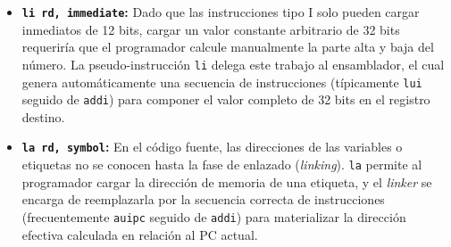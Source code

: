 \begin{itemize}
    \item \textbf{\texttt{li rd, immediate}:} Dado que las instrucciones tipo I solo pueden cargar inmediatos de 12 bits, cargar un valor constante arbitrario de 32 bits requeriría que el programador calcule manualmente la parte alta y baja del número. La pseudo-instrucción \texttt{li} delega este trabajo al ensamblador, el cual genera automáticamente una secuencia de instrucciones (típicamente \texttt{lui} seguido de \texttt{addi}) para componer el valor completo de 32 bits en el registro destino.
    \item \textbf{\texttt{la rd, symbol}:} En el código fuente, las direcciones de las variables o etiquetas no se conocen hasta la fase de enlazado (\textit{linking}). \texttt{la} permite al programador cargar la dirección de memoria de una etiqueta, y el \textit{linker} se encarga de reemplazarla por la secuencia correcta de instrucciones (frecuentemente \texttt{auipc} seguido de \texttt{addi}) para materializar la dirección efectiva calculada en relación al PC actual.
\end{itemize}


\chapterend{}